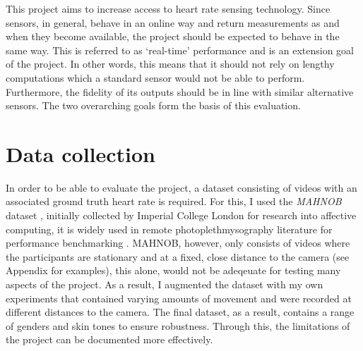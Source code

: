 This project aims to increase access to heart rate sensing technology.
Since sensors, in general, behave in an online way and return measurements as and when they become available, the project should be expected to behave in the same way.
This is referred to as `real-time' performance and is an extension goal of the project.
In other words, this means that it should not rely on lengthy computations which a standard sensor would not be able to perform. 
Furthermore, the fidelity of its outputs should be in line with similar alternative sensors.
The two overarching goals form the basis of this evaluation.

\section{Data collection}
In order to be able to evaluate the project, a dataset consisting of videos with an associated ground truth heart rate is required.
For this, I used the \textit{MAHNOB} dataset \cite{Mahnob}, initially collected by Imperial College London for research into affective computing, it is widely used in remote photoplethmysography literature for performance benchmarking \cite{novel}\cite{mahnob-example}\cite{mahnob-example-2}.
MAHNOB, however, only consists of videos where the participants are stationary and at a fixed, close distance to the camera (see Appendix for examples), this alone, would not be adeqeuate for testing many aspects of the project.
As a result, I augmented the dataset with my own experiments that contained varying amounts of movement and were recorded at different distances to the camera. 
The final dataset, as a result, contains a range of genders and skin tones to ensure robustness.
Through this, the limitations of the project can be documented more effectively.

